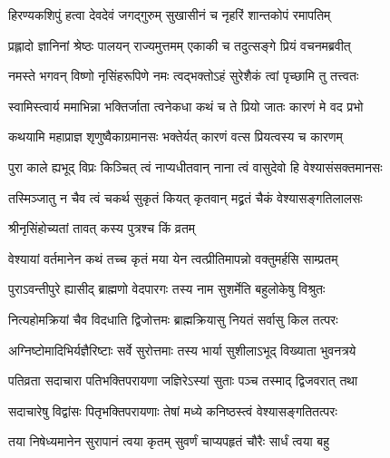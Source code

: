 

\twolineshloka
{हिरण्यकशिपुं हत्वा देवदेवं जगद्गुरुम्}
{सुखासीनं च नृहरिं शान्तकोपं रमापतिम्} %

\twolineshloka
{प्रह्लादो ज्ञानिनां श्रेष्ठः पालयन् राज्यमुत्तमम्}
{एकाकी च तदुत्सङ्गे प्रियं वचनमब्रवीत्} %


\twolineshloka
{नमस्ते भगवन् विष्णो नृसिंहरूपिणे नमः}
{त्वद्भक्तोऽहं सुरेशैकं त्वां पृच्छामि तु तत्त्वतः} %

\twolineshloka
{स्वामिस्त्वार्य ममाभिन्ना भक्तिर्जाता त्वनेकधा}
{कथं च ते प्रियो जातः कारणं मे वद प्रभो} %


\twolineshloka
{कथयामि महाप्राज्ञ शृणुष्वैकाग्रमानसः}
{भक्तेर्यत् कारणं वत्स प्रियत्वस्य च कारणम्} %

\twolineshloka
{पुरा काले ह्यभूद् विप्रः किञ्चित् त्वं नाप्यधीतवान्}
{नाना त्वं वासुदेवो हि वेश्यासंसक्तमानसः} %


\twolineshloka
{तस्मिञ्जातु न चैव त्वं चकर्थ सुकृतं कियत्}
{कृतवान् मद्व्रतं चैकं वेश्यासङ्गतिलालसः} %



\onelineshloka
{श्रीनृसिंहोच्यतां तावत् कस्य पुत्रश्च किं व्रतम्} %

\twolineshloka
{वेश्यायां वर्तमानेन कथं तच्च कृतं मया}
{येन त्वत्प्रीतिमापन्नो वक्तुमर्हसि साम्प्रतम्} %


\twolineshloka
{पुराऽवन्तीपुरे ह्यासीद् ब्राह्मणो वेदपारगः}
{तस्य नाम सुशर्मेति बहुलोकेषु विश्रुतः} %

\twolineshloka
{नित्यहोमक्रियां चैव विदधाति द्विजोत्तमः}
{ब्राह्मक्रियासु नियतं सर्वासु किल तत्परः} %

\twolineshloka
{अग्निष्टोमादिभिर्यज्ञैरिष्टाः सर्वे सुरोत्तमाः}
{तस्य भार्या सुशीलाऽभूद् विख्याता भुवनत्रये} %

\twolineshloka
{पतिव्रता सदाचारा पतिभक्तिपरायणा}
{जज्ञिरेऽस्यां सुताः पञ्च तस्माद् द्विजवरात् तथा} %

\twolineshloka
{सदाचारेषु विद्वांसः पितृभक्तिपरायणाः}
{तेषां मध्ये कनिष्ठस्त्वं वेश्यासङ्गतितत्परः} %

\twolineshloka
{तया निषेध्यमानेन सुरापानं त्वया कृतम्}
{सुवर्णं चाप्यपहृतं चौरैः सार्धं त्वया बहु} %

